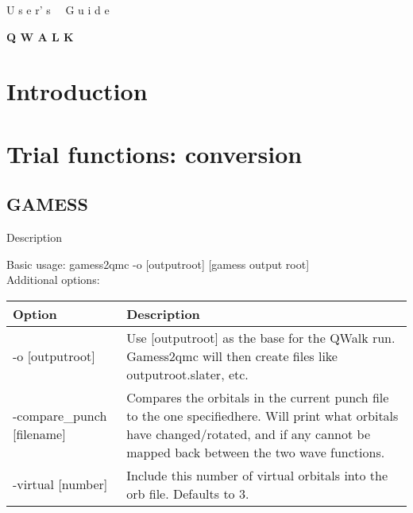 \documentclass[12pt]{article}
\begin{document}
\begin{titlepage}
\begin{center}

\vspace{1cm}
{\Huge {\sc U s e r' s \, \, G u i d e}}

\vspace{1cm}
\hrulefill
\vspace{1cm}

{\Huge {\bf Q W A L K }}

\vspace{1cm}
\hrulefill
\vspace{1cm}
\end{center}

\end{titlepage}

\tableofcontents

\newpage

\section{Introduction}

\section{Trial functions: conversion}

\subsection{GAMESS}
Description

Basic usage: gamess2qmc -o [outputroot]  [gamess output root] \\
Additional options: \\

\begin{tabular}{lp{8cm}}
\hline
 Option & Description \\
\hline
-o [outputroot] & Use [outputroot] as the base for the QWalk run.
Gamess2qmc will then create files like outputroot.slater, etc.\\
-compare\_punch [filename]  &  Compares the orbitals in the current punch file to the one specifiedhere.  Will print what orbitals have changed/rotated, and if any cannot be mapped back between the two wave functions. \\
-virtual [number] & Include this number of virtual orbitals into the orb file.  Defaults to 3. \\
\hline
\end{tabular}
\end{document}
